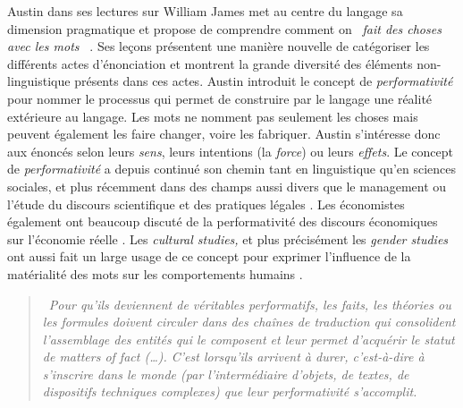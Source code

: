 Austin dans ses lectures sur William James met au centre du langage sa dimension pragmatique et propose de comprendre comment on \textit{{\guillemotleft}~fait des choses avec les mots~{\guillemotright}} \citep{Austin1975}. Ses le\c{c}ons présentent une manière nouvelle de catégoriser les différents actes d{\textquoteright}énonciation et montrent la grande diversité des éléments non-linguistique présents dans ces actes. Austin introduit le concept de \textit{performativité }pour nommer le processus qui permet de construire par le langage une réalité extérieure au langage. Les mots ne nomment pas seulement les choses mais peuvent également les faire changer, voire les fabriquer. Austin s{\textquoteright}intéresse donc aux énoncés selon leurs \textit{sens}, leurs intentions (la \textit{force}) ou leurs \textit{effets}. Le concept de \textit{performativité }a depuis continué son chemin tant en linguistique qu{\textquoteright}en sciences sociales, et plus récemment dans des champs aussi divers que le management ou l{\textquoteright}étude du discours scientifique et des pratiques légales \citep{Denis2006}. Les économistes également ont beaucoup discuté de la performativité des discours économiques sur l{\textquoteright}économie réelle \citep{Mackenzie2006}. Les \textit{cultural studies,} et plus précisément les \textit{gender studies }ont aussi fait un large usage de ce concept pour exprimer l{\textquoteright}influence de la matérialité des mots sur les comportements humains \citep{Butler1993}.  

\begin{quote}
    {\guillemotleft}~\textit{Pour qu{\textquoteright}ils deviennent de {\guillemotleft} véritables {\guillemotright} performatifs, les faits, les théories ou les formules doivent circuler dans des cha\^ines de traduction qui consolident l{\textquoteright}assemblage des entités qui le composent et leur permet d{\textquoteright}acquérir le statut de {\guillemotleft} matters of fact {\guillemotright} ({\dots}). C{\textquoteright}est lorsqu{\textquoteright}ils arrivent à durer, c{\textquoteright}est-à-dire à s{\textquoteright}inscrire dans le monde (par l{\textquoteright}intermédiaire d{\textquoteright}objets, de textes, de dispositifs techniques complexes) que leur performativité s{\textquoteright}accomplit.}~{\guillemotright} \citep{Denis2006}
\end{quote}

